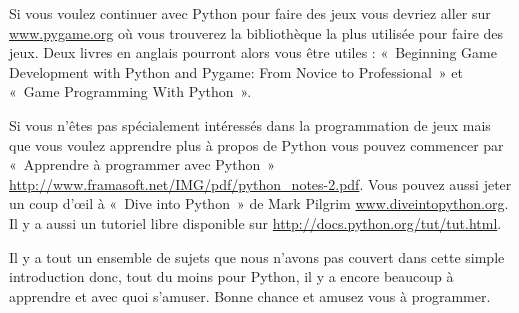 Si vous voulez continuer avec Python pour faire des jeux vous devriez aller sur \url{www.pygame.org} où vous trouverez la bibliothèque la plus utilisée pour faire des jeux. Deux livres en anglais pourront alors vous être utiles : «~Beginning Game Development with Python and Pygame: From Novice to Professional~» et «~Game Programming With Python~».


Si vous n'êtes pas spécialement intéressés dans la programmation de jeux mais que vous voulez apprendre plus à propos de Python vous pouvez commencer par «~Apprendre à programmer avec Python~» \url{http://www.framasoft.net/IMG/pdf/python_notes-2.pdf}. Vous pouvez aussi jeter un coup d'œil à «~Dive into Python~» de Mark Pilgrim \url{www.diveintopython.org}. Il y a aussi un tutoriel libre disponible sur \url{http://docs.python.org/tut/tut.html}.

Il y a tout un ensemble de sujets que nous n'avons pas couvert dans cette simple introduction donc, tout du moins pour Python, il y a encore beaucoup à apprendre et avec quoi s'amuser. Bonne chance et amusez vous à programmer.
 
